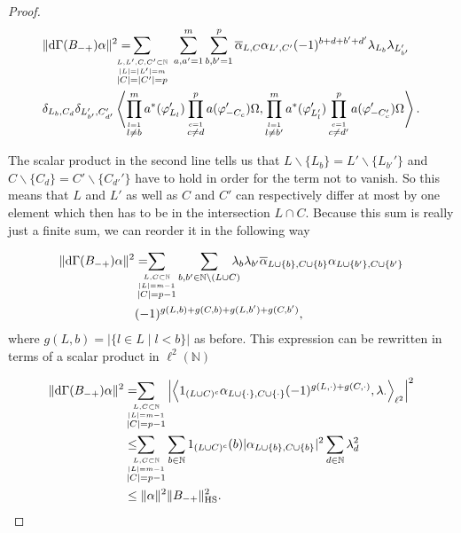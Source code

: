 \documentclass[b5paper,draft,openbib,12pt]{memoir}
\begin{document}
\begin{proof}
\begin{align}\nonumber
&\|\mathrm{d}\Gamma(B_{-+})\alpha\|^2= \hspace{-0.5cm}\sum_{\overset{L,L',C,C'\subset\mathbb{N}}{\overset{|L|=|L'|=m}{|C|=|C'|=p}}} ~\sum_{a,a'=1}^m \sum_{b,b'=1}^p
\overline{\alpha}_{L,C} \alpha_{L',C'}(-1)^{b+d+b'+d'}\lambda_{L_b} \lambda_{L_{b'}'} \\
&\delta_{L_b,C_d} \delta_{L_{b'}',C_{d'}'} \left\langle \prod_{\overset{l=1}{l\neq b}}^m a^*(\varphi_{L_l}')\prod_{\overset{c=1}{c\neq d}}^p 
a(\varphi_{-C_c}')\Omega, \prod_{\overset{l=1}{l\neq b'}}^m a^*(\varphi_{L_l'}')
\prod_{\overset{c=1}{c\neq d'}}^p a(\varphi_{-C_c'}')\Omega\right\rangle.
\end{align}

The scalar product in the second line tells us that \(L\backslash \{L_b\}=L'\backslash \{L_{b'}'\}\) and \(C\backslash \{C_{d}\}=C'\backslash \{C_{d'}'\}\) have
to hold in order for the term not to vanish. So this means that \(L\) and \(L'\) as well as \(C\) and \(C'\) can respectively differ at most by one element
which then has to be in the intersection \(L\cap C\). Because this sum is really just a finite sum, we can reorder it in the following way

\begin{align}\nonumber
\|\mathrm{d}\Gamma(B_{-+})\alpha\|^2
&=\hspace{-0.4cm}\sum_{\overset{L,C\subset\mathbb{N}}{\overset{|L|=m-1}{|C|=p-1}}} \sum_{b,b'\in \mathbb{N}\backslash (L\cup C)}\hspace{-0.3cm} \lambda_{b} \lambda_{b'} 
\overline{\alpha}_{L\cup\{b\},C\cup \{b\}} \alpha_{L\cup\{b'\},C\cup\{b'\}}\\
&(-1)^{g(L,b)+g(C,b)+g(L,b')+g(C,b')},
\end{align}
where \(g(L,b)=|\{l\in L \mid l<b\}|\) as before. This expression can be rewritten in terms of a scalar product in \(\ell^2(\mathbb{N})\)

\begin{align}\nonumber
\|\mathrm{d}\Gamma(B_{-+})\alpha\|^2
&=\hspace{-0.4cm}\sum_{\overset{L,C\subset\mathbb{N}}{\overset{|L|=m-1}{|C|=p-1}}} \left|\left\langle 1_{(L\cup C)^c} \alpha_{L\cup \{\cdot \}, C\cup \{\cdot\}} (-1)^{g(L,\cdot)+g(C,\cdot)},\lambda_\cdot \right\rangle_{\ell^2}  \right|^2 \\
&\le \hspace{-0.4cm}\sum_{\overset{L,C\subset\mathbb{N}}{\overset{|L|=m-1}{|C|=p-1}}} \sum_{b\in \mathbb{N}} 1_{(L\cup C)^c}(b) |\alpha_{L\cup\{b\},C\cup\{b\}}|^2 \sum_{d\in\mathbb{N}}\lambda_d^2\\
&\le \|\alpha\|^2 \|B_{-+}\|^2_{\text{HS}}.
\end{align}

\end{proof}
\end{document}
